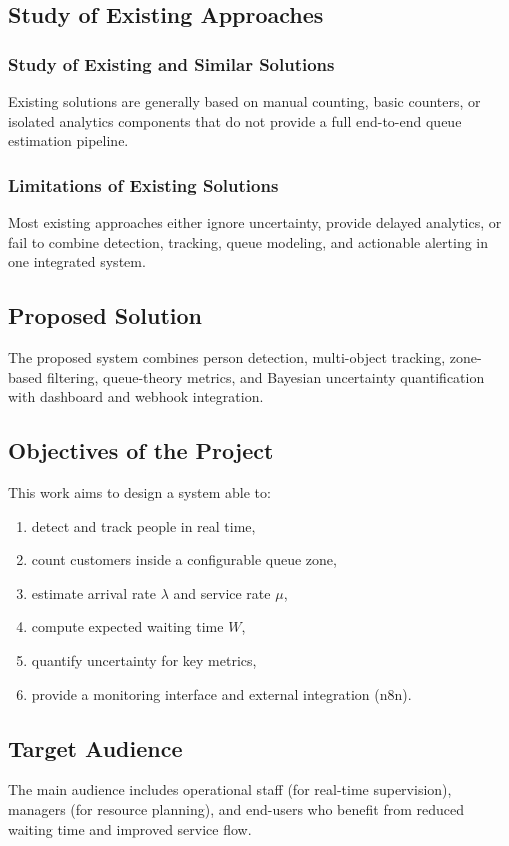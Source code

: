 \subsection{Study of Existing Approaches}

\subsubsection{Study of Existing and Similar Solutions}
Existing solutions are generally based on manual counting, basic counters, or isolated analytics components that do not provide a full end-to-end queue estimation pipeline.

\subsubsection{Limitations of Existing Solutions}
Most existing approaches either ignore uncertainty, provide delayed analytics, or fail to combine detection, tracking, queue modeling, and actionable alerting in one integrated system.

\subsection{Proposed Solution}
The proposed system combines person detection, multi-object tracking, zone-based filtering, queue-theory metrics, and Bayesian uncertainty quantification with dashboard and webhook integration.

\subsection{Objectives of the Project}
This work aims to design a system able to:
\begin{enumerate}
    \item detect and track people in real time,
    \item count customers inside a configurable queue zone,
    \item estimate arrival rate $\lambda$ and service rate $\mu$,
    \item compute expected waiting time $W$,
    \item quantify uncertainty for key metrics,
    \item provide a monitoring interface and external integration (n8n).
\end{enumerate}

\subsection{Target Audience}
The main audience includes operational staff (for real-time supervision), managers (for resource planning), and end-users who benefit from reduced waiting time and improved service flow.

